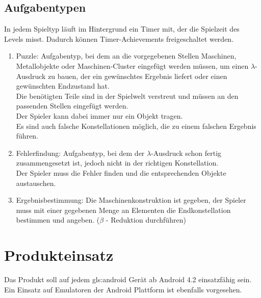 \documentclass{scrartcl}
\begin{document}
\clearpage


\subsection{Aufgabentypen} \label{subsection:Aufgabentypen}

In jedem Spieltyp läuft im Hintergrund ein Timer mit, der die Spielzeit des Levels misst. Dadurch können Timer-Achievements freigeschaltet werden.
\begin{enumerate}
	\item \label{aufgabentyp:puzzle} Puzzle: Aufgabentyp, bei dem an die vorgegebenen Stellen Maschinen, Metallobjekte oder Maschinen-Cluster eingefügt werden müssen, um einen $\lambda$-Ausdruck zu bauen, der ein gewünschtes Ergebnis liefert oder einen gewünschten Endzustand hat.\\
	Die benötigten Teile sind in der Spielwelt verstreut und müssen an den passenden Stellen eingefügt werden.\\
	Der Spieler kann dabei immer nur ein Objekt tragen.\\
	Es sind auch falsche Konstellationen möglich, die zu einem falschen Ergebnis führen.\\
	\item \label{aufgabentyp:fehlerfindung} Fehlerfindung: Aufgabentyp, bei dem der $\lambda$-Ausdruck schon fertig zusammengesetzt ist, jedoch nicht in der richtigen Konstellation.\\
	Der Spieler muss die Fehler finden und die entsprechenden Objekte austauschen.\\
	\item \label{aufgabentyp:ergebnis} Ergebnisbestimmung: Die Maschinenkonstruktion ist gegeben, der Spieler muss mit einer gegebenen Menge an Elementen die Endkonstellation bestimmen und angeben. ($\beta$ - Reduktion durchführen) 
\end{enumerate}

\clearpage









\section{Produkteinsatz}

Das Produkt soll auf jedem \gls{gls:android} Gerät ab Android 4.2 einsatzfähig sein. Ein Einsatz auf Emulatoren der Android Plattform ist ebenfalls vorgesehen.
\end{document}
